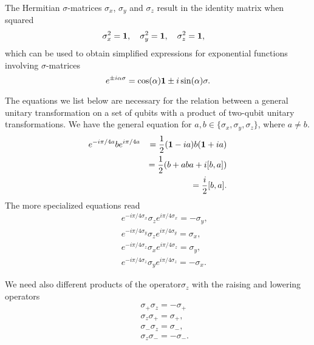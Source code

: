 \documentclass[aps,pra,twocolumn,floatfix]{revtex4}
\begin{document}
The Hermitian $\sigma$-matrices $\sigma_x$, $\sigma_y$ and $\sigma_z$
result in the identity matrix when squared
\begin{equation}
\sigma_x^2 = {\bf 1},\quad 
\sigma_y^2 = {\bf 1},\quad 
\sigma_z^2 = {\bf 1},\quad 
\end{equation}
which can be used to obtain  simplified expressions for exponential functions involving $\sigma$-matrices
\begin{equation}
e^{\pm i\alpha \sigma}=\cos(\alpha) {\bf 1} \pm i \sin(\alpha) \sigma. 
\end{equation}

The equations we list below are necessary for the relation between  a general unitary
transformation on a set of qubits with  a product of two-qubit unitary
transformations. We have the general equation for $a,b \in \{\sigma_x,\sigma_y, \sigma_z\}$, where $a\neq b$.
\begin{eqnarray}
  e^{-i\pi/4a} b e^{i\pi/4a} &&= \frac{1}{2} ({\bf 1} -ia) b ( {\bf 1} + ia)
  \notag\\ 
  &&=  \frac{1}{2} (b + aba + i[b,a]) \notag\\
  &&= \frac{i}{2}[b,a].
\end{eqnarray}
The more specialized equations read
\begin{eqnarray}
  \label{eq:rotations1}
  &&e^{-i\pi/4 \sigma_x} \sigma_z e^{i\pi/4 \sigma_x} = -\sigma_y, \\
  \label{eq:rotations2}
  &&e^{-i\pi/4 \sigma_y} \sigma_z e^{i\pi/4 \sigma_y} = \sigma_x, \\
  \label{eq:rotations3}
  &&e^{-i\pi/4 \sigma_z} \sigma_x e^{i\pi/4 \sigma_z} = \sigma_y, \\
  \label{eq:rotations4}
  &&e^{-i\pi/4 \sigma_z} \sigma_y e^{i\pi/4 \sigma_z} = -\sigma_x. 
\end{eqnarray}

We need also different products of the operator$\sigma_z$  with the  raising and lowering operators
\begin{eqnarray}
\label{eq:pmzs}
  &&\sigma_+ \sigma_z = -\sigma_+ \\
  &&\sigma_z \sigma_+ = \sigma_+, \\
  &&\sigma_- \sigma_z = \sigma_-, \\
  &&\sigma_z \sigma_- = -\sigma_-. \\
\end{eqnarray}
\end{document}
